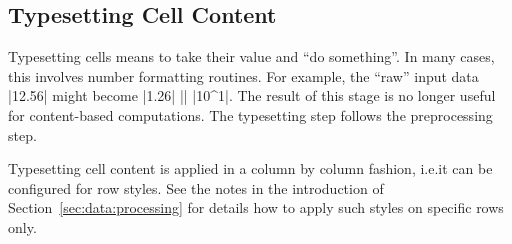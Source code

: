 \documentclass[a4paper]{ltxdoc}
\begin{document}
\subsection{Typesetting Cell Content}

Typesetting cells means to take their value and ``do something''. In many
cases, this involves number formatting routines. For example, the ``raw'' input
data |12.56| might become |1.26| |\cdot| |10^1|. The result of this stage is no
longer useful for content-based computations. The typesetting step follows the
preprocessing step.

Typesetting cell content is applied in a column by column fashion, i.e.\@ it
can be configured for row styles. See the notes in the introduction of
Section~\ref{sec:data:processing} for details how to apply such styles on
specific rows only.
\end{document}
